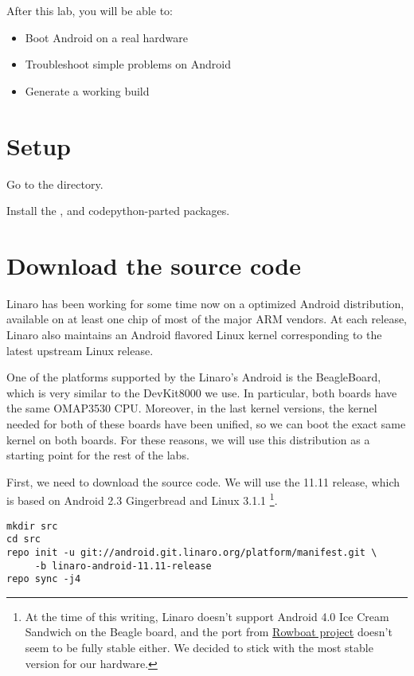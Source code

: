 
After this lab, you will be able to:
\begin{itemize}
  \item Boot Android on a real hardware
  \item Troubleshoot simple problems on Android
  \item Generate a working build
\end{itemize}

\section{Setup}

Go to the  directory.

Install the ,  and code{python-parted} packages.

\section{Download the source code}

Linaro has been working for some time now on a optimized Android distribution,
available on at least one chip of most of the major ARM vendors. At each release,
Linaro also maintains an Android flavored Linux kernel corresponding to the latest
upstream Linux release.

One of the platforms supported by the Linaro's Android is the BeagleBoard, which
is very similar to the DevKit8000 we use. In particular, both boards have the
same OMAP3530 CPU. Moreover, in the last kernel versions,
the kernel needed for both of these boards have been unified, so we can boot the
exact same kernel on both boards. For these reasons, we will use this
distribution as a starting point for the rest of the labs.

First, we need to download the source code. We will use the 11.11 release, which
is based on Android 2.3 Gingerbread and Linux 3.1.1
\footnote{At the time of this writing, Linaro doesn't support Android 4.0 Ice Cream
Sandwich on the Beagle board, and the port from \href{http://code.google.com/p/rowboat}
{Rowboat project} doesn't seem to be fully stable either. We decided to stick
with the most stable version for our hardware.}.

\begin{verbatim}
mkdir src
cd src
repo init -u git://android.git.linaro.org/platform/manifest.git \
     -b linaro-android-11.11-release
repo sync -j4
\end{verbatim}

